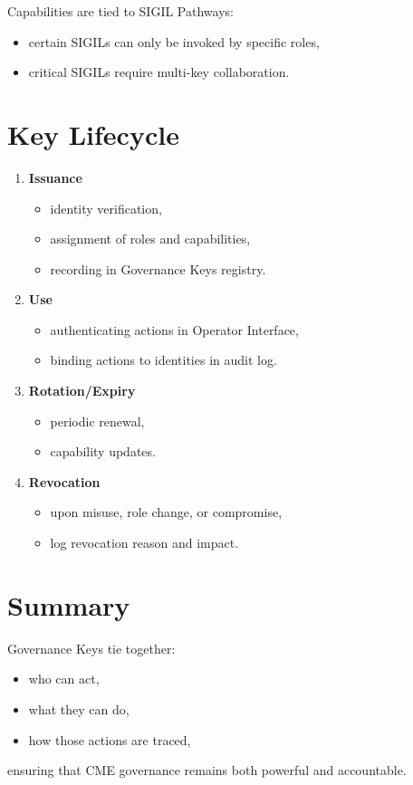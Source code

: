 Capabilities are tied to SIGIL Pathways:
\begin{itemize}
    \item certain SIGILs can only be invoked by specific roles,
    \item critical SIGILs require multi-key collaboration.
\end{itemize}

\section{Key Lifecycle}

\begin{enumerate}
    \item \textbf{Issuance}  
          \begin{itemize}
              \item identity verification,
              \item assignment of roles and capabilities,
              \item recording in Governance Keys registry.
          \end{itemize}
    \item \textbf{Use}  
          \begin{itemize}
              \item authenticating actions in Operator Interface,
              \item binding actions to identities in audit log.
          \end{itemize}
    \item \textbf{Rotation/Expiry}  
          \begin{itemize}
              \item periodic renewal,
              \item capability updates.
          \end{itemize}
    \item \textbf{Revocation}  
          \begin{itemize}
              \item upon misuse, role change, or compromise,
              \item log revocation reason and impact.
          \end{itemize}
\end{enumerate}

\section{Summary}

Governance Keys tie together:
\begin{itemize}
    \item who can act,
    \item what they can do,
    \item how those actions are traced,
\end{itemize}
ensuring that CME governance remains both powerful and accountable.

